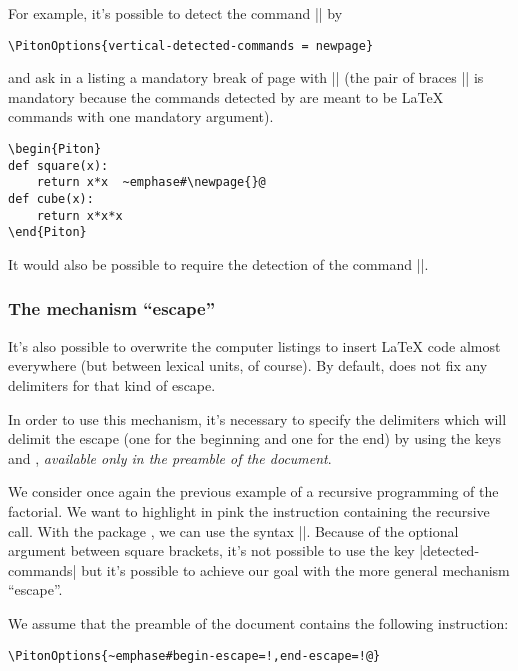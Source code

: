 \documentclass{article}
\begin{document}
\smallskip
For example, it's possible to detect the command |\newpage| by

\begin{Verbatim}
\PitonOptions{vertical-detected-commands = newpage}
\end{Verbatim}

and ask in a listing a mandatory break of page with |\newpage{}| (the pair of braces |{}|
is mandatory because the commands detected by  are meant to be LaTeX commands
with one mandatory argument).

\begin{Verbatim}
\begin{Piton}
def square(x):
    return x*x  ~emphase#\newpage{}@
def cube(x):
    return x*x*x
\end{Piton}
\end{Verbatim}

\medskip
It would also be possible to require the detection of the command |\vspace|.

\subsubsection{The mechanism ``escape''}

\label{escape}

It's also possible to overwrite the computer listings to insert LaTeX code
almost everywhere (but between lexical units, of course). By default,
 does not fix any delimiters for that kind of escape.

In order to use this mechanism, it's necessary to specify the delimiters which
will delimit the escape (one for the beginning and one for the end) by using
the keys  and , \emph{available only
in the preamble of the document}.

\medskip
We consider once again the previous example of a recursive programming of
the factorial. We want to highlight in pink the instruction containing the
recursive call. With the package , we can use the syntax
||. Because of the optional argument between square
brackets, it's not possible to use the key |detected-commands| but it's
possible to achieve our goal with the more general mechanism ``escape''.

\medskip
We assume that the preamble of the document contains the following
instruction:

\begin{Verbatim}
\PitonOptions{~emphase#begin-escape=!,end-escape=!@}
\end{Verbatim}
\end{document}
